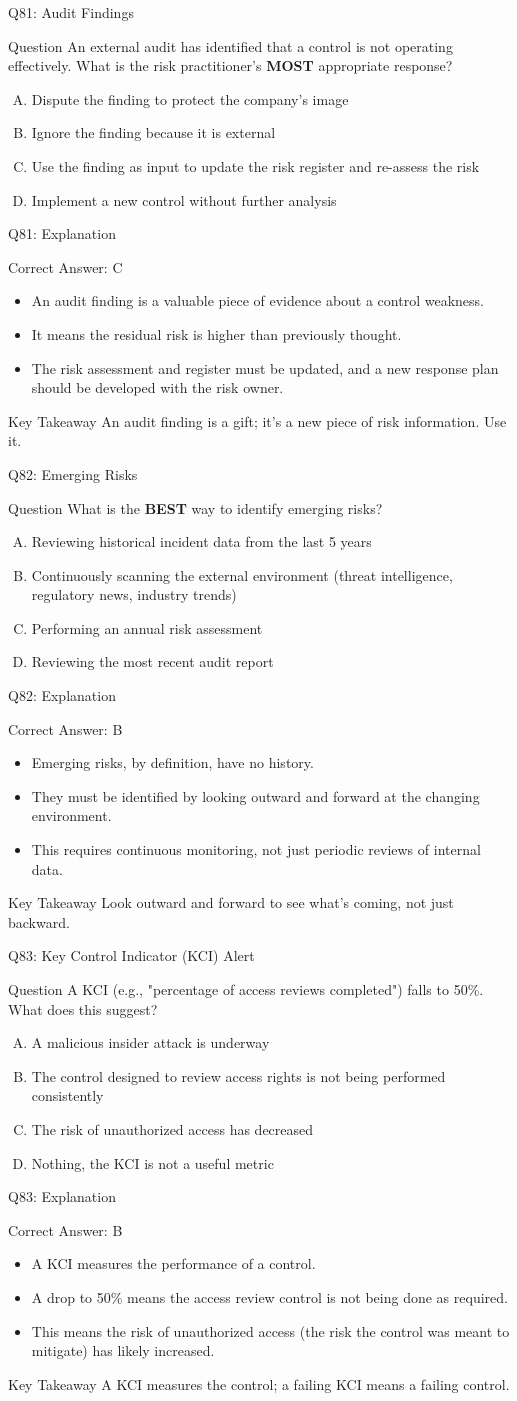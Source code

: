 \documentclass[aspectratio=169]{beamer}
\newcommand{\hq}[7]{%
	\begin{frame}{Q#1: #2}
		\begin{block}{Question}
			#3
		\end{block}
		\begin{enumerate}[(A)]
			#4
		\end{enumerate}
	\end{frame}
	\begin{frame}{Q#1: Explanation}
		\begin{block}{Correct Answer: #5}
			\begin{itemize}
				#6
			\end{itemize}
		\end{block}
		\begin{alertblock}{Key Takeaway}
			#7
		\end{alertblock}
	\end{frame}
}
\begin{document}
	\hq{81}{Audit Findings}
	{An external audit has identified that a control is not operating effectively. What is the risk practitioner's \textbf{MOST} appropriate response?}
	{\item Dispute the finding to protect the company's image
		\item Ignore the finding because it is external
		\item Use the finding as input to update the risk register and re-assess the risk
		\item Implement a new control without further analysis}
	{C}
	{\item An audit finding is a valuable piece of evidence about a control weakness.
		\item It means the residual risk is higher than previously thought.
		\item The risk assessment and register must be updated, and a new response plan should be developed with the risk owner.}
	{An audit finding is a gift; it's a new piece of risk information. Use it.}
	
	\hq{82}{Emerging Risks}
	{What is the \textbf{BEST} way to identify emerging risks?}
	{\item Reviewing historical incident data from the last 5 years
		\item Continuously scanning the external environment (threat intelligence, regulatory news, industry trends)
		\item Performing an annual risk assessment
		\item Reviewing the most recent audit report}
	{B}
	{\item Emerging risks, by definition, have no history.
		\item They must be identified by looking outward and forward at the changing environment.
		\item This requires continuous monitoring, not just periodic reviews of internal data.}
	{Look outward and forward to see what's coming, not just backward.}
	
	\hq{83}{Key Control Indicator (KCI) Alert}
	{A KCI (e.g., "percentage of access reviews completed") falls to 50\%. What does this suggest?}
	{\item A malicious insider attack is underway
		\item The control designed to review access rights is not being performed consistently
		\item The risk of unauthorized access has decreased
		\item Nothing, the KCI is not a useful metric}
	{B}
	{\item A KCI measures the performance of a control.
		\item A drop to 50\% means the access review control is not being done as required.
		\item This means the risk of unauthorized access (the risk the control was meant to mitigate) has likely increased.}
	{A KCI measures the control; a failing KCI means a failing control.}
	
\end{document}
